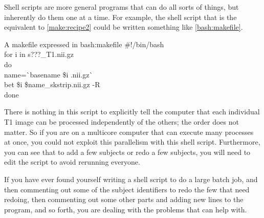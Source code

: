 Shell scripts are more general programs that can do all sorts of things, but inherently do them one at a time. For example, the shell script that is the equivalent to \autoref{make:recipe2} could be written something like \autoref{bash:makefile}.
	
\begin{bash}{A makefile expressed in \bashn{}}{bash:makefile}
	\#!/bin/bash \\
	for i in s???_T1.nii.gz \\
	do \\
	name=\`{}basename \$i .nii.gz\`{} \\
	bet \$i \${name}_skstrip.nii.gz -R \\
	done
\end{bash}
	
There is nothing in this script to explicitly tell the computer that each individual T1 image can be processed independently of the others; the order does not matter. So if you are on a multicore computer that can execute many processes at once, you could not exploit this parallelism with this shell script. Furthermore, you can see that to add a few subjects or redo a few subjects, you will need to edit the script to avoid rerunning everyone. 
	
If you have ever found yourself writing a shell script to do a large batch job, and then commenting out some of the subject identifiers to redo the few that need redoing, then commenting out some other parts and adding new lines to the program, and so forth, you are dealing with the problems that \maken{} can help with.